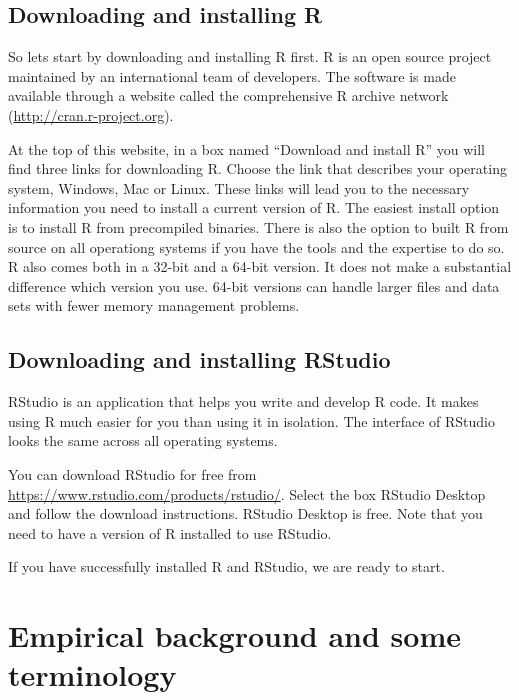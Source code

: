 \documentclass[
]{book}
\begin{document}
\hypertarget{downloading-and-installing-r}{%
\section{Downloading and installing R}\label{downloading-and-installing-r}}

So lets start by downloading and installing R first. R is an open source project maintained
by an international team of developers. The software is made available through a website called
the comprehensive R archive network (\url{http://cran.r-project.org}).

At the top of this website, in a box named ``Download and install R'' you will find three
links for downloading R. Choose the link that describes your operating system, Windows, Mac or
Linux. These links will lead you to the necessary information you need to install a current
version of R. The easiest install option is to install R from precompiled binaries. There is also
the option to built R from source on all operationg systems if you have the tools and the
expertise to do so. R also comes both in a 32-bit and a 64-bit version. It does not make
a substantial difference which version you use. 64-bit versions
can handle larger files and data sets with fewer memory management problems.

\hypertarget{downloading-and-installing-rstudio}{%
\section{Downloading and installing RStudio}\label{downloading-and-installing-rstudio}}

RStudio is an application that helps you write and develop R code. It makes using
R much easier for you than using it in isolation. The interface of RStudio looks the
same across all operating systems.

You can download RStudio for free from \url{https://www.rstudio.com/products/rstudio/}.
Select the box RStudio Desktop and follow the download instructions. RStudio Desktop is free.
Note that you need to have a version of R installed to use RStudio.

If you have successfully installed R and RStudio, we are ready to start.

\hypertarget{empirical-background-and-some-terminology}{%
\chapter{Empirical background and some terminology}\label{empirical-background-and-some-terminology}}
\end{document}
